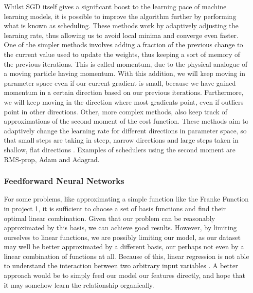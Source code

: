 \documentclass[onecolumn,10pt,cleanfoot]{asme2ej}
\begin{document}
Whilst SGD itself gives a significant boost to the learning pace of machine learning models, it is possible to improve the algorithm further by performing what is known as scheduling. These methods work by adaptively adjusting the learning rate, thus allowing us to avoid local minima and converge even faster. One of the simpler methods involves adding a fraction of the previous change to the current value used to update the weights, thus keeping a sort of memory of the previous iterations. This is called momentum, due to the physical analogue of a moving particle having momentum. With this addition, we will keep moving in parameter space even if our current gradient is small, because we have gained momentum in a certain direction based on our previous iterations. Furthermore, we will keep moving in the direction where most gradients point, even if outliers point in other directions. Other, more complex methods, also keep track of approximations of the second moment of the cost function. These methods aim to adaptively change the learning rate for different directions in parameter space, so that small steps are taking in steep, narrow directions and large steps taken in shallow, flat directions \cite{mortensched}. Examples of schedulers using the second moment are RMS-prop, Adam and Adagrad.


\subsubsection{Feedforward Neural Networks}

For some problems, like approximating a simple function like the Franke Function in project 1, it is sufficient to choose a set of basis functions and find their optimal linear combination. Given that our problem can be reasonably approximated by this basis, we can achieve good results. However, by limiting ourselves to linear functions, we are possibly limiting our model, as our dataset may well be better approximated by a different basis, our perhaps not even by a linear combination of functions at all. Because of this, linear regression is not able to understand the interaction between two arbitrary input variables \cite[165]{gbc}. A better approach would be to simply feed our model our features directly, and hope that it may somehow learn the relationship organically.
\end{document}
